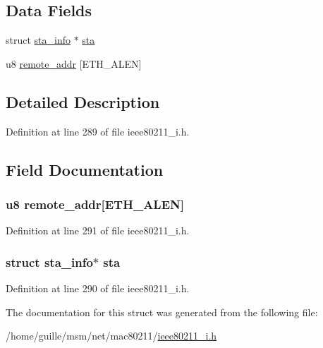 \subsection*{Data Fields}
\begin{DoxyCompactItemize}
\item 
struct \hyperlink{structsta__info}{sta\-\_\-info} $\ast$ \hyperlink{structieee80211__if__wds_aafa9dadbeccd54b4a6b9f77f2908a093}{sta}
\item 
u8 \hyperlink{structieee80211__if__wds_aba4535f0b49a74e9fb64b3a6e9da433d}{remote\-\_\-addr} \mbox{[}E\-T\-H\-\_\-\-A\-L\-E\-N\mbox{]}
\end{DoxyCompactItemize}


\subsection{Detailed Description}


Definition at line 289 of file ieee80211\-\_\-i.\-h.



\subsection{Field Documentation}
\hypertarget{structieee80211__if__wds_aba4535f0b49a74e9fb64b3a6e9da433d}{
\subsubsection[{remote\-\_\-addr}]{\setlength{\rightskip}{0pt plus 5cm}u8 remote\-\_\-addr\mbox{[}E\-T\-H\-\_\-\-A\-L\-E\-N\mbox{]}}}\label{structieee80211__if__wds_aba4535f0b49a74e9fb64b3a6e9da433d}


Definition at line 291 of file ieee80211\-\_\-i.\-h.

\hypertarget{structieee80211__if__wds_aafa9dadbeccd54b4a6b9f77f2908a093}{
\subsubsection[{sta}]{\setlength{\rightskip}{0pt plus 5cm}struct {\bf sta\-\_\-info}$\ast$ sta}}\label{structieee80211__if__wds_aafa9dadbeccd54b4a6b9f77f2908a093}


Definition at line 290 of file ieee80211\-\_\-i.\-h.



The documentation for this struct was generated from the following file\-:\begin{DoxyCompactItemize}
\item 
/home/guille/msm/net/mac80211/\hyperlink{ieee80211__i_8h}{ieee80211\-\_\-i.\-h}\end{DoxyCompactItemize}
